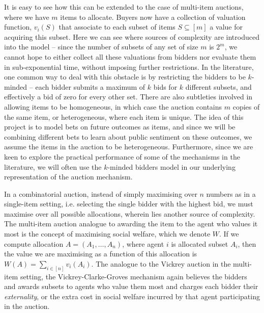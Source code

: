 \documentclass[10pt,a4paper]{article}
\theoremstyle{plain}
\theoremstyle{definition}
\begin{document}
	It is easy to see how this can be extended to the case of multi-item
	auctions, where we have $m$ items to allocate. Buyers now have a collection
	of valuation function, $v_i(S)$ that associate to each subset of items $S
	\subseteq [m]$ a value for acquiring this subset. Here we can see where
	sources of complexity are introduced into the model -- since the number of
	subsets of any set of size $m$ is $2^m$, we cannot hope to either collect
	all these valuations from bidders nor evaluate them in sub-exponential
	time, without imposing further restrictions. In the literature, one common
	way to deal with this obstacle is by restricting the bidders to be
	$k$-minded -- each bidder submits a maximum of $k$ bids for $k$ different
	subsets, and effectively a bid of zero for every other set. There are also
	subtleties involved in allowing items to be homogeneous, in which case the
	auction contains $m$ copies of the same item, or heterogeneous, where each
	item is unique. The idea of this project is to model bets on future
	outcomes as items, and since we will be combining different bets to learn
	about public sentiment on these outcomes, we assume the items in the
	auction to be heterogeneous. Furthermore, since we are keen to explore the
	practical performance of some of the mechanisms in the literature, we will
	often use the $k$-minded bidders model in our underlying representation of
	the auction mechanism.

	In a combinatorial auction, instead of simply maximising over $n$ numbers
	as in a single-item setting, i.e. selecting the single bidder with the
	highest bid, we must maximise over all possible allocations, wherein lies
	another source of complexity. The multi-item auction analogue to awarding
	the item to the agent who values it most is the concept of maximising
	social welfare, which we denote $W$. If we compute allocation $A = (A_1,
	\ldots, A_n)$, where agent $i$ is allocated subset $A_i$, then the value we
	are maximising as a function of this allocation is $W(A) = \sum_{i \in [n]}
	v_i(A_i)$. The analogue to the Vickrey auction in the multi-item setting,
	the Vickrey-Clarke-Groves mechanism \cite{Vickrey1961, Clarke1971,
	Groves1973} again believes the bidders and awards subsets to agents who
	value them most and charges each bidder their \emph{externality}, or the
	extra cost in social welfare incurred by that agent participating in the
	auction.
\end{document}
